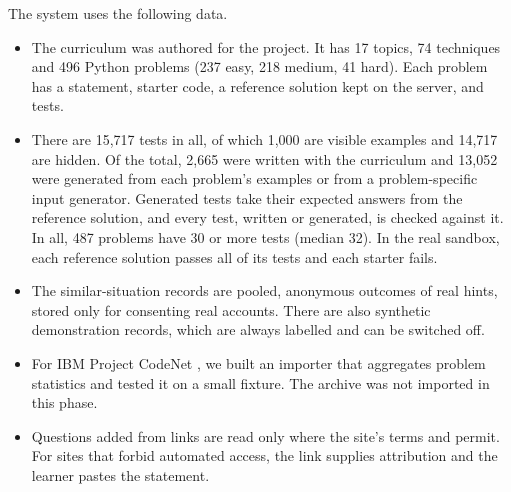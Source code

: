 The system uses the following data.
\begin{itemize}
\item The curriculum was authored for the project. It has 17 topics, 74 techniques and 496 Python problems (237 easy, 218 medium, 41 hard). Each problem has a statement, starter code, a reference solution kept on the server, and tests.
\item There are 15,717 tests in all, of which 1,000 are visible examples and 14,717 are hidden. Of the total, 2,665 were written with the curriculum and 13,052 were generated from each problem's examples or from a problem-specific input generator. Generated tests take their expected answers from the reference solution, and every test, written or generated, is checked against it. In all, 487 problems have 30 or more tests (median 32). In the real sandbox, each reference solution passes all of its tests and each starter fails.
\item The similar-situation records are pooled, anonymous outcomes of real hints, stored only for consenting real accounts. There are also synthetic demonstration records, which are always labelled and can be switched off.
\item For IBM Project CodeNet \cite{puri2021}, we built an importer that aggregates problem statistics and tested it on a small fixture. The archive was not imported in this phase.
\item Questions added from links are read only where the site's terms and  permit. For sites that forbid automated access, the link supplies attribution and the learner pastes the statement.
\end{itemize}
